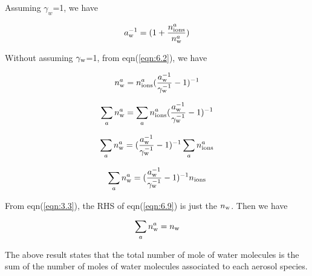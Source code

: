 \documentclass[12pt]{article}
\begin{document}
Assuming $\gamma_{w}$=1, we have 

\begin{equation}\label{eqn:6.5}
a_{\rm w}^{-1}=(1+\frac{n_{\rm ions}^{a}}{n_{\rm w}^{a}})
\end{equation}

Without assuming $\gamma_{\rm w}$=1, from eqn(\ref{eqn:6.2}), we have

\begin{equation}\label{eqn:6.6}
n_{\rm w}^{a}=n_{\rm ions}^{a}(\frac{a_{\rm w}^{-1}}{\gamma_{\rm w}^{-1}}-1)^{-1}
\end{equation}

\begin{equation}\label{eqn:6.7}
\sum_{a} n_{\rm w}^{a}=\sum_{a}n_{\rm ions}^{a}(\frac{a_{\rm w}^{-1}}{\gamma_{\rm w}^{-1}}-1)^{-1}
\end{equation}

\begin{equation}\label{eqn:6.8}
\sum_{a} n_{\rm w}^{a}=(\frac{a_{\rm w}^{-1}}{\gamma_{\rm w}^{-1}}-1)^{-1}\sum_{a}n_{\rm ions}^{a}
\end{equation}

\begin{equation}\label{eqn:6.9}
\sum_{a} n_{\rm w}^{a}=(\frac{a_{\rm w}^{-1}}{\gamma_{\rm w}^{-1}}-1)^{-1} n_{\rm ions}
\end{equation}

From eqn(\ref{eqn:3.3}), the RHS of eqn(\ref{eqn:6.9}) is just the $n_{\rm w}$. Then we have 

\begin{equation}\label{eqn:6.10}
\sum_{a} n_{\rm w}^{a}=n_{\rm w}
\end{equation}

The above result states that the total number of mole of water molecules is the sum of the number of moles of water molecules associated to each aerosol species. 




\end{document}
